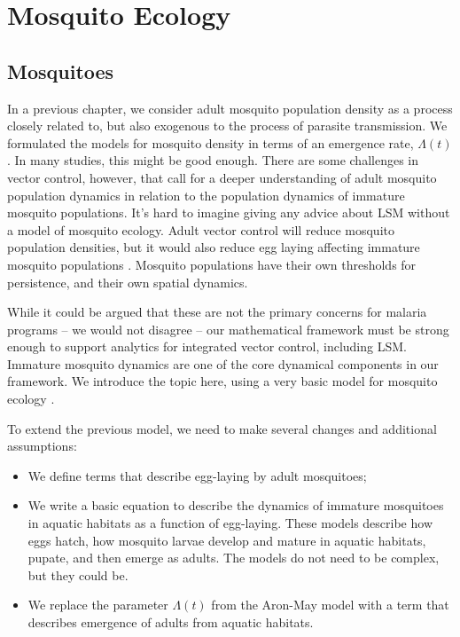 \documentclass[
]{book}
\begin{document}
\part{Mosquito Ecology}\label{part-mosquito-ecology}

\chapter{Mosquitoes}\label{mosquitoes}

In a previous chapter, we consider adult mosquito population density as a process closely related to, but also exogenous to the process of parasite transmission. We formulated the models for mosquito density in terms of an emergence rate, \(\Lambda(t)\). In many studies, this might be good enough. There are some challenges in vector control, however, that call for a deeper understanding of adult mosquito population dynamics in relation to the population dynamics of immature mosquito populations. It's hard to imagine giving any advice about LSM without a model of mosquito ecology. Adult vector control will reduce mosquito population densities, but it would also reduce egg laying affecting immature mosquito populations \autocite{BradyOJ2015AdultVector}. Mosquito populations have their own thresholds for persistence, and their own spatial dynamics.

While it could be argued that these are not the primary concerns for malaria programs -- we would not disagree -- our mathematical framework must be strong enough to support analytics for integrated vector control, including LSM. Immature mosquito dynamics are one of the core dynamical components in our framework. We introduce the topic here, using a very basic model for mosquito ecology \autocite{SmithDL2013LarvalDynamics}.

To extend the previous model, we need to make several changes and additional assumptions:

\begin{itemize}
\item
  We define terms that describe egg-laying by adult mosquitoes;
\item
  We write a basic equation to describe the dynamics of immature mosquitoes in aquatic habitats as a function of egg-laying. These models describe how eggs hatch, how mosquito larvae develop and mature in aquatic habitats, pupate, and then emerge as adults. The models do not need to be complex, but they could be.
\item
  We replace the parameter \(\Lambda(t)\) from the Aron-May model with a term that
  describes emergence of adults from aquatic habitats.
\end{itemize}
\end{document}
